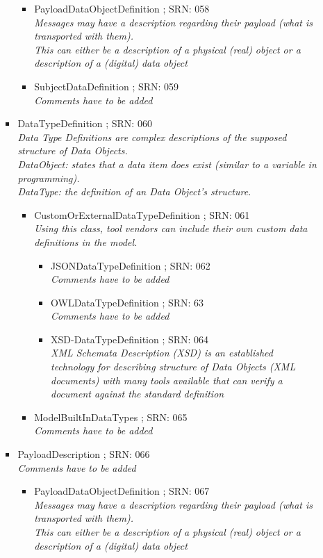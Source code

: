 \begin{itemize}
\begin{itemize}
\begin{itemize}
\begin{itemize}
			\item PayloadDataObjectDefinition ; SRN: 058 \\ \textit{Messages may have a description regarding their payload (what is transported with them).\\This can either be a description of a physical (real) object or a description of a (digital) data object}
			\item SubjectDataDefinition ; SRN: 059 \\ \textit{Comments have to be added}
		\end{itemize}
		\item DataTypeDefinition ; SRN: 060 \\ \textit{Data Type Definitions are complex descriptions of the supposed structure of Data Objects. \\ DataObject: states that a data item does exist (similar to a variable in programming). \\DataType: the definition of an Data Object's structure.}
		\begin{itemize}
			\item CustomOrExternalDataTypeDefinition ; SRN: 061 \\ \textit{Using this class, tool vendors can include their own custom data definitions in the model.}
			\begin{itemize}
					\item JSONDataTypeDefinition ; SRN: 062 \\ \textit{Comments have to be added}
					\item OWLDataTypeDefinition ; SRN: 63 \\ \textit{Comments have to be added}
					\item XSD-DataTypeDefinition ; SRN: 064 \\ \textit{XML Schemata Description (XSD) is an established technology for describing structure of Data Objects (XML documents) with many tools available that can verify a document against the standard definition}
			\end{itemize}
			\item ModelBuiltInDataTypes ; SRN: 065 \\ \textit{Comments have to be added}
		\end{itemize}
		\item PayloadDescription ; SRN: 066 \\ \textit{Comments have to be added}
		\begin{itemize}
			\item PayloadDataObjectDefinition ; SRN: 067 \\ \textit{Messages may have a description regarding their payload (what is transported with them).\\This can either be a description of a physical (real) object or a description of a (digital) data object}

\end{itemize}
\end{itemize}
\end{itemize}
\end{itemize}
